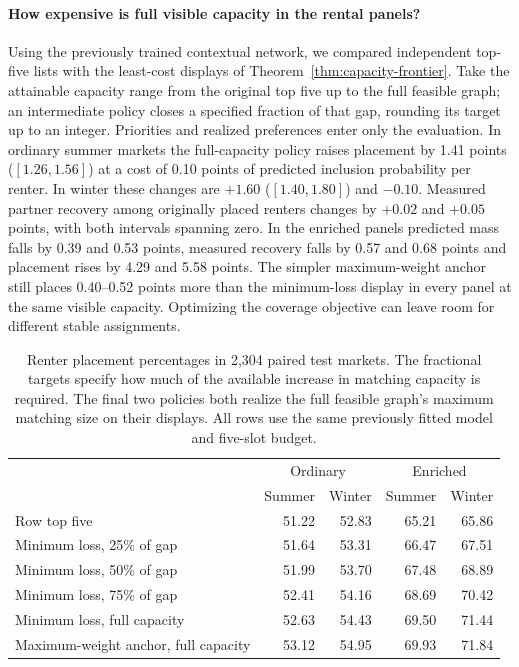 \paragraph{How expensive is full visible capacity in the rental panels?}
Using the previously trained contextual network, we compared independent top-five lists with the least-cost displays of Theorem~\ref{thm:capacity-frontier}. Take the attainable capacity range from the original top five up to the full feasible graph; an intermediate policy closes a specified fraction of that gap, rounding its target up to an integer. Priorities and realized preferences enter only the evaluation. In ordinary summer markets the full-capacity policy raises placement by 1.41 points ($[1.26,1.56]$) at a cost of 0.10 points of predicted inclusion probability per renter. In winter these changes are $+1.60$ ($[1.40,1.80]$) and $-0.10$. Measured partner recovery among originally placed renters changes by $+0.02$ and $+0.05$ points, with both intervals spanning zero. In the enriched panels predicted mass falls by 0.39 and 0.53 points, measured recovery falls by 0.57 and 0.68 points and placement rises by 4.29 and 5.58 points. The simpler maximum-weight anchor still places 0.40--0.52 points more than the minimum-loss display in every panel at the same visible capacity. Optimizing the coverage objective can leave room for different stable assignments.

\begin{table}[ht]\centering\small
\caption{Renter placement percentages in 2,304 paired test markets. The fractional targets specify how much of the available increase in matching capacity is required. The final two policies both realize the full feasible graph's maximum matching size on their displays. All rows use the same previously fitted model and five-slot budget.}
\label{tab:rental-frontier}\begin{tabular}{@{}lrrrr@{}}\toprule
 & \multicolumn{2}{c}{Ordinary} & \multicolumn{2}{c}{Enriched}\\
 & Summer & Winter & Summer & Winter\\\midrule
Row top five & 51.22 & 52.83 & 65.21 & 65.86\\
Minimum loss, 25\% of gap & 51.64 & 53.31 & 66.47 & 67.51\\
Minimum loss, 50\% of gap & 51.99 & 53.70 & 67.48 & 68.89\\
Minimum loss, 75\% of gap & 52.41 & 54.16 & 68.69 & 70.42\\
Minimum loss, full capacity & 52.63 & 54.43 & 69.50 & 71.44\\
Maximum-weight anchor, full capacity & 53.12 & 54.95 & 69.93 & 71.84\\\bottomrule
\end{tabular}\end{table}
